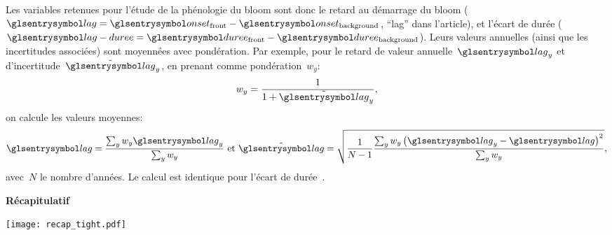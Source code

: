 Les variables retenues pour l'étude de la phénologie du bloom sont donc le retard au démarrage du bloom (\(\am{lag} = \am{onset}_\frt - \am{onset}_\bkg \), \enquote{lag} dans l'article), et l'écart de durée (\(\am{lag-duree} = \am{duree}_\frt - \am{duree}_\bkg\)).
Leurs valeurs annuelles (ainsi que les incertitudes associées) sont moyennées avec pondération.
Par exemple, pour le retard de valeur annuelle~\(\am{lag}_y\) et d'incertitude~\(\err{\am{lag}}_y\), en prenant comme pondération~\(w_y\):
\begin{equation}
  w_y = \frac 1 {1 + \err{\am{lag}}_y} ,
\end{equation}
on calcule les valeurs moyennes:
\begin{equation}
  \am{lag} = \frac {\sum_y w_y \am{lag}_y} {\sum_y w_y}
  \text{ et }
  \err{\am{lag}} = \sqrt{ \frac1{N-1} \frac {\sum_y w_y \paren{\am{lag}_y - \am{lag}}^2 } {\sum_y w_y} },
\end{equation}
avec~\(N\) le nombre d'années.
Le calcul est identique pour l'écart de durée~.

{
  \clearpage%
  \centering%
  {\large\bfseries Récapitulatif}
  \vspace{2\onelineskip}
  \texttt{[image: recap\_tight.pdf]}%
  \clearpage%
}
